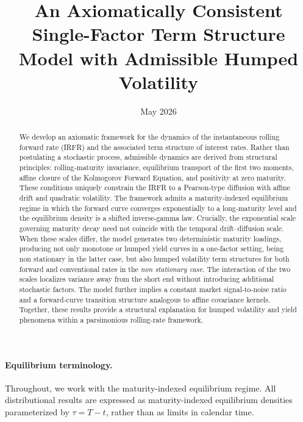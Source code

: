 \documentclass[12pt]{article}
\title{An Axiomatically Consistent Single-Factor Term Structure Model with Admissible Humped Volatility}
\date{May 2026}
\theoremstyle{statementstyle}
\begin{document}
\maketitle
\vspace{-1.0em}


\begin{abstract}
We develop an axiomatic framework for the dynamics of the instantaneous rolling forward rate (IRFR) and the associated term structure of interest rates. Rather than postulating a stochastic process, admissible dynamics are derived from structural principles: rolling‑maturity invariance, equilibrium transport of the first two moments, affine closure of the Kolmogorov Forward Equation, and positivity at zero maturity. These conditions uniquely constrain the IRFR to a Pearson‑type diffusion with affine drift and quadratic volatility.
The framework admits a maturity‑indexed equilibrium regime in which the forward curve converges exponentially to a long‑maturity level and the equilibrium density is a shifted inverse‑gamma law. Crucially, the exponential scale governing maturity decay need not coincide with the temporal drift–diffusion scale. When these scales differ, the model generates two deterministic maturity loadings, producing not only monotone or humped yield curves in a one‑factor setting, being non stationary in the latter case, but also humped volatility term structures for both forward and conventional rates in the \emph{non stationary case}. The interaction of the two scales localizes variance away from the short end without introducing additional stochastic factors. The model further implies a constant market signal‑to‑noise ratio and a forward‑curve transition structure analogous to affine covariance kernels. Together, these results provide a structural explanation for humped volatility and yield phenomena within a parsimonious rolling‑rate framework.
\end{abstract}


\paragraph{Equilibrium terminology.}
Throughout, we work with the maturity-indexed equilibrium regime. All distributional results are expressed as maturity-indexed equilibrium densities parameterized by $\tau = T-t$, rather than as limits in calendar time.
\end{document}
